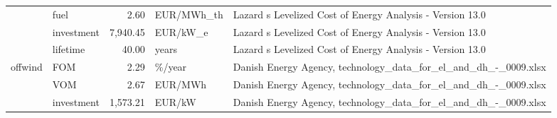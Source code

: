 \begin{longtable}{p{5cm}p{3cm}rp{3cm}p{11cm}}
                      & fuel &           2.60 &                        EUR/MWh\_th &                                                                                                                                                                                                                                                                            Lazard s Levelized Cost of Energy Analysis - Version 13.0 \\
                      & investment &       7,940.45 &                          EUR/kW\_e &                                                                                                                                                                                                                                                                            Lazard s Levelized Cost of Energy Analysis - Version 13.0 \\
                      & lifetime &          40.00 &                             years &                                                                                                                                                                                                                                                                            Lazard s Levelized Cost of Energy Analysis - Version 13.0 \\
offwind & FOM &           2.29 &                            \%/year &                                                                                                                                                                                                                                                                      Danish Energy Agency, technology\_data\_for\_el\_and\_dh\_-\_0009.xlsx \\
                      & VOM &           2.67 &                           EUR/MWh &                                                                                                                                                                                                                                                                      Danish Energy Agency, technology\_data\_for\_el\_and\_dh\_-\_0009.xlsx \\
                      & investment &       1,573.21 &                            EUR/kW &                                                                                                                                                                                                                                                                      Danish Energy Agency, technology\_data\_for\_el\_and\_dh\_-\_0009.xlsx \\

\end{longtable}
